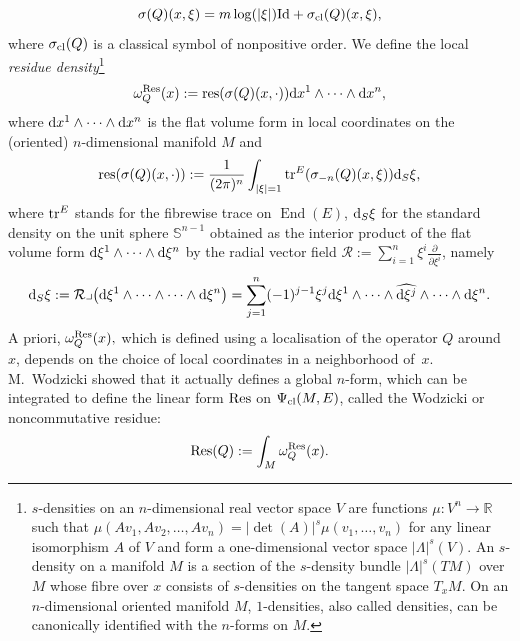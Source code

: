 \documentclass[10pt,a4paper]{amsart}
\numberwithin{equation}{section}
\theoremstyle{definition}
\newcommand{\R}{\mathbb R}
\begin{document}
\[
\sigma(Q)(x,\xi)=m \log (|\xi|){\rm Id} +\sigma_{\rm cl}( Q)(x,\xi),
\]
where $\sigma_{\rm cl}(Q)$ is a classical symbol of nonpositive order.
We define the local {\it residue density}\footnote{$s$-densities on an $n$-dimensional real vector space $V$ are functions $\mu\colon V^n\to \R$ such that $\mu(Av_1, Av_2, \dots, A v_n)=\allowbreak \vert \det (A)\vert^s \mu(v_1, \dots, v_n)$ for any linear isomorphism $A$ of $V$ and form a one-dimensional vector space $\vert \Lambda \vert^s(V)$. An $s$-density on a manifold $M$ is a section of the $s$-density bundle $\vert \Lambda\vert^s(TM)$ over $M$ whose fibre over $x$ consists of $s$-densities on the tangent space $T_xM$. On an $n$-dimensional oriented manifold $M$, $1$-densities, also called densities, can be canonically identified with the $n$-forms on $ M$.}
\begin{equation}\label{eq:Wodzres}
 \omega_Q^{\rm Res}(x):= {\rm res}(\sigma(Q)(x,\cdot)) {\rm d}x^1\wedge\dots \wedge {\rm d}x^n ,
 \end{equation}
where $ {\rm d}x^1\wedge\dots \wedge {\rm d}x^n $ is the flat volume form in local coordinates on the (oriented) $n$-dimensional manifold $M$ and
\[ {\rm res}(\sigma(Q)(x,\cdot)):=\frac{1}{(2\pi)^n} \int_{|\xi|=1}{\rm tr}^E(\sigma_{-n}(Q) (x, \xi)) {\rm d}_S\xi,\]
where ${\rm tr}^E$ stands for the fibrewise trace on $\operatorname{End}(E)$, ${\rm d}_{S}\xi$ for the standard density on the unit sphere $\mathbb{S}^{n-1}$ obtained as the interior product of the flat volume form ${\rm d}\xi^1\wedge \dots \wedge {\rm d}\xi^n$ by the radial vector field ${\mathcal R} :=\sum_{i=1}^n \xi^i\frac{\partial}{\partial\xi^i}$, namely
\[
{\rm d}_{S}\xi:={\mathcal R}\lrcorner\bigl({\rm d}\xi^1\wedge\dots \wedge \dots \wedge {\rm d}\xi^n\bigr)= \sum_{j=1}^{n} (-1)^{j-1} \xi^j {\rm d}\xi^1\wedge\dots \wedge \widehat{{\rm d}\xi^j}\wedge \dots \wedge {\rm d}\xi^n.
\]
A priori, $\omega_Q^{\rm Res}(x),$ which is defined using a localisation of the operator $Q$ around $x$, depends on the choice of local coordinates in a neighborhood of~$x$.
M.~Wodzicki \cite{W} showed that it actually defines a global $n$-form, which can be integrated to define the linear form ${\rm Res}$ on $\Psi_{\rm cl}(M, E)$, called the Wodzicki or noncommutative residue:
\[{\rm Res}(Q):= \int_M \omega_Q^{\rm Res}(x).\]
\end{document}
